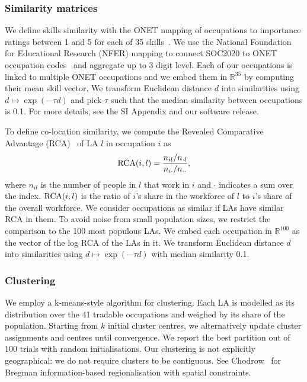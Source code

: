 \documentclass[aps,pre,floats,floatfix,superscriptaddress,twocolumn,final,10pt]{revtex4-2}
\theoremstyle{definition}
\begin{document}
\subsubsection{Similarity matrices}
We define skills similarity with the ONET mapping of occupations to importance ratings between 1 and 5 for each of 35 skills~\cite{ONETSkills}. We use the National Foundation for Educational Research (NFER) mapping to connect SOC2020 to ONET occupation codes~\cite{NFERMapping} and aggregate up to 3 digit level. Each of our occupations is linked to multiple ONET occupations and we embed them in $\mathbb{R}^{35}$ by computing their mean skill vector. We transform Euclidean distance $d$ into similarities using $d\mapsto \exp(-\tau d)$ and pick $\tau$ such that the median similarity between occupations is 0.1. For more details, see the SI Appendix and our software release.

To define co-location similarity, we compute the Revealed Comparative Advantage (RCA)~\cite{Balassa1965} of LA $l$ in occupation $i$ as
\begin{equation}
    \textnormal{RCA}(i, l) = \frac{n_{il}/n_{\cdot l}}{n_{i\cdot}/n_{\cdot\cdot}},
\end{equation}
where $n_{il}$ is the number of people in $l$ that work in $i$ and $\cdot$ indicates a sum over the index. $\textnormal{RCA}(i, l)$ is the ratio of $i$'s share in the workforce of $l$ to $i$'s share of the overall workforce. We consider occupations as similar if LAs have similar RCA in them. To avoid noise from small population sizes, we restrict the comparison to the 100 most populous LAs. We embed each occupation in $\mathbb{R}^{100}$ as the vector of the log RCA of the LAs in it. We transform Euclidean distance $d$ into similarities using $d\mapsto \exp(-\tau d)$ with median similarity 0.1.


\subsubsection{Clustering}
We employ a k-means-style algorithm for clustering. Each LA is modelled as its distribution over the 41 tradable occupations and weighed by its share of the population. Starting from $k$ initial cluster centres, we alternatively update cluster assignments and centres until convergence. We report the best partition out of 100 trials with random initialisations. Our clustering is not explicitly geographical: we do not require clusters to be contiguous. See Chodrow~\cite{Chodrow2017} for Bregman information-based regionalisation with spatial constraints.
\end{document}
